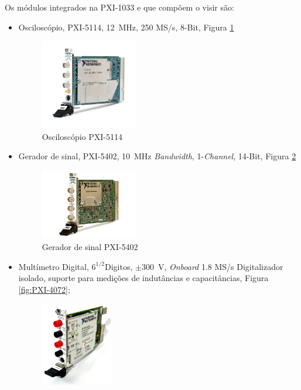 Os módulos integrados na PXI-1033 e que compõem o \acrshort{visir} são:
\begin{itemize}
    \item Osciloscópio, PXI-5114, \SI{12}{\MHz}, 250 MS/s, 8-Bit, Figura \ref{fig:PXI-5114}
          \begin{figure}[hbtp]
              \centering
              \includegraphics[width=0.4\textwidth]{figures/PXI-5114.png}
              \caption{Osciloscópio PXI-5114 \cite{PXI-5114}}
              \label{fig:PXI-5114}
          \end{figure}
    \item Gerador de sinal, PXI-5402, \SI{10}{\MHz} \textit{Bandwidth}, 1-\textit{Channel}, 14-Bit, Figura \ref{fig:PXI-5402}
          \begin{figure}[hbtp]
              \centering
              \includegraphics[width=0.4\textwidth]{figures/PXI-5402.png}
              \caption{Gerador de sinal PXI-5402 \cite{PXI-5402}}
              \label{fig:PXI-5402}
          \end{figure}
    \item Multímetro Digital, \(6^{1/2} \)Digitos, \(\pm\)\SI{300}{\volt}, \textit{Onboard} 1.8 MS/s Digitalizador isolado, suporte para medições de indutâncias e capacitâncias, Figura \ref{fig:PXI-4072};
          \begin{figure}[hbtp]
              \centering
              \includegraphics[width=0.3\textwidth]{figures/PXI-4072.png}

\end{figure}
\end{itemize}
